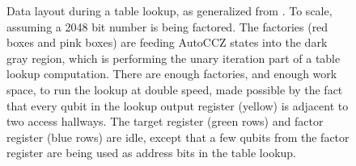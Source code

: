 \documentclass[superscriptaddress,notitlepage,longbibliography]{revtex4-1}
\theoremstyle{definition}
\theoremstyle{definition}
\begin{document}
\begin{figure}
    \label{fig:addition-layout-2d}
\end{figure}

\begin{figure}
    \label{fig:lookup-layout}
    \caption{
        Data layout during a table lookup, as generalized from \cite{gidney2019autoccz}.
        To scale, assuming a 2048 bit number is being factored.
        The factories (red boxes and pink boxes) are feeding AutoCCZ states into the dark gray region, which is performing the unary iteration part of a table lookup computation.
        There are enough factories, and enough work space, to run the lookup at double speed, made possible by the fact that every qubit in the lookup output register (yellow) is adjacent to two access hallways.
        The target register (green rows) and factor register (blue rows) are idle, except that a few qubits from the factor register are being used as address bits in the table lookup.
    }
\end{figure}
\end{document}
